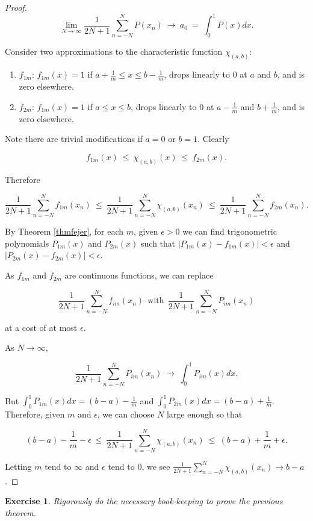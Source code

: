\documentclass[12pt,letterpaper]{report}
\newcommand\be{\begin{equation}}
\newcommand\ee{\end{equation}}
\newcommand\ben{\begin{enumerate}}
\newcommand\een{\end{enumerate}}
\newtheorem{exe}[thm]{Exercise}
\begin{document}
\begin{proof}
\be \lim_{N\to \infty} \frac{1}{2 N + 1} \sum_{n=-N}^N P(x_n) \
\to \ a_0 \ = \ \int_0^1 P(x)dx. \ee

Consider two approximations to the characteristic function
$\chi_{(a,b)}$:

\ben
\item $f_{1m}$: $f_{1m}(x) = 1$ if $a + \frac{1}{m} \le x \le b -
\frac{1}{m}$, drops linearly to $0$ at $a$ and $b$, and is zero
elsewhere.
\item $f_{2m}$: $f_{1m}(x) = 1$ if $a \le x \le b$, drops linearly to
$0$ at $a-\frac{1}{m}$ and $b+\frac{1}{m}$, and is zero elsewhere.
\een

Note there are trivial modifications if $a = 0$ or $b = 1$.
Clearly

\be f_{1m}(x) \ \le \ \chi_{(a,b)}(x) \ \le \ f_{2m}(x). \ee

Therefore

\be \frac{1}{2N+1} \sum_{n=-N}^N f_{1m}(x_n) \ \le \
\frac{1}{2N+1} \sum_{n=-N}^N \chi_{(a,b)}(x_n) \ \le \
\frac{1}{2N+1} \sum_{n=-N}^N f_{2m}(x_n). \ee

By Theorem \ref{thmfejer}, for each $m$, given $\epsilon > 0$ we
can find trigonometric polynomials $P_{1m}(x)$ and $P_{2m}(x)$
such that $|P_{1m}(x) - f_{1m}(x)| < \epsilon$ and $|P_{2m}(x) -
f_{2m}(x)| < \epsilon$.

As $f_{1m}$ and $f_{2m}$ are continuous functions, we can replace

\be \frac{1}{2N+1} \sum_{n=-N}^N f_{im}(x_n) \ \ \mbox{with} \ \
\frac{1}{2N+1} \sum_{n=-N}^N P_{im}(x_n) \ee

at a cost of at most $\epsilon$.

As $N \rightarrow \infty$,

\be \frac{1}{2N+1} \sum_{n=-N}^N P_{im}(x_n) \ \rightarrow \
\int_0^1 P_{im}(x)dx. \ee

But $\int_0^1 P_{1m}(x)dx = (b-a) - \frac{1}{m}$ and $\int_0^1
P_{2m}(x)dx = (b-a) + \frac{1}{m}$. Therefore, given $m$ and
$\epsilon$, we can choose $N$ large enough so that

\be (b-a) - \frac{1}{m} - \epsilon \ \le \ \frac{1}{2N+1}
\sum_{n=-N}^N \chi_{(a,b)}(x_n) \ \le \ (b-a) + \frac{1}{m} +
\epsilon. \ee

Letting $m$ tend to $\infty$ and $\epsilon$ tend to $0$, we see
$\frac{1}{2N+1} \sum_{n=-N}^N \chi_{(a,b)}(x_n) \rightarrow b -
a$.
\end{proof}

\begin{exe} Rigorously do the necessary book-keeping to prove the
previous theorem. \end{exe}
\end{document}
